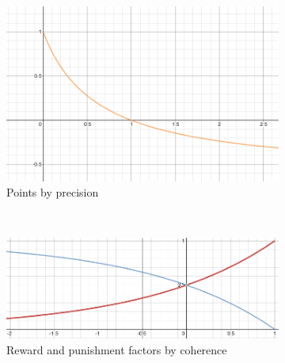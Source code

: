 \begin{figure}
    \centering
    \begin{subfigure}[b]{0.3\textwidth}
        \includegraphics[width=\textwidth]{img/stdPrecision.png}
        \caption{Points by precision}
        \label{fig:prec}
    \end{subfigure}
    ~ %
    \begin{subfigure}[b]{0.3\textwidth}
        \includegraphics[width=\textwidth]{img/stdFactors.png}
        \caption{Reward and punishment factors by coherence}
        \label{fig:stdf}
    \end{subfigure}
    ~ %
    \begin{subfigure}[b]{0.3\textwidth}

\end{subfigure}
\end{figure}

